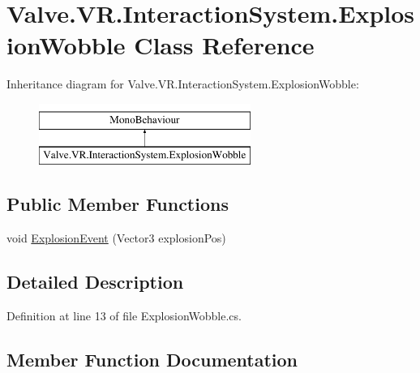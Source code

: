 \hypertarget{class_valve_1_1_v_r_1_1_interaction_system_1_1_explosion_wobble}{}\section{Valve.\+V\+R.\+Interaction\+System.\+Explosion\+Wobble Class Reference}
\label{class_valve_1_1_v_r_1_1_interaction_system_1_1_explosion_wobble}
Inheritance diagram for Valve.\+V\+R.\+Interaction\+System.\+Explosion\+Wobble\+:\begin{figure}[H]
\begin{center}
\leavevmode
\includegraphics[height=2.000000cm]{class_valve_1_1_v_r_1_1_interaction_system_1_1_explosion_wobble}
\end{center}
\end{figure}
\subsection*{Public Member Functions}
\begin{DoxyCompactItemize}
\item 
void \mbox{\hyperlink{class_valve_1_1_v_r_1_1_interaction_system_1_1_explosion_wobble_ae98902965c44e7376a71ce9931e92c59}{Explosion\+Event}} (Vector3 explosion\+Pos)
\end{DoxyCompactItemize}


\subsection{Detailed Description}


Definition at line 13 of file Explosion\+Wobble.\+cs.



\subsection{Member Function Documentation}
\mbox{\label{class_valve_1_1_v_r_1_1_interaction_system_1_1_explosion_wobble_ae98902965c44e7376a71ce9931e92c59}} 
